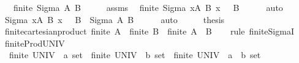 \begin{isabellebody}
\ \ \ {\isachardoublequoteopen}finite\ {\isacharparenleft}{\kern0pt}Sigma\ A\ B{\isacharparenright}{\kern0pt}{\isachardoublequoteclose}\isanewline
%
\isadelimproof
%
\endisadelimproof
%
\isatagproof
{}\isamarkupfalse%
\ {\isacharminus}{\kern0pt}\isanewline
\ \ \isamarkupfalse%
\ assms\ \isamarkupfalse%
\ {\isachardoublequoteopen}finite\ {\isacharparenleft}{\kern0pt}Sigma\ {\isacharbraceleft}{\kern0pt}x{\isasymin}A{\isachardot}{\kern0pt}\ B\ x\ {\isasymnoteq}\ {\isacharbraceleft}{\kern0pt}{\isacharbraceright}{\kern0pt}{\isacharbraceright}{\kern0pt}\ B{\isacharparenright}{\kern0pt}{\isachardoublequoteclose}\isanewline
\ \ \ \ \isamarkupfalse%
\ auto\isanewline
\ \ \isamarkupfalse%
\ \isamarkupfalse%
\ {\isachardoublequoteopen}Sigma\ {\isacharbraceleft}{\kern0pt}x{\isacharcolon}{\kern0pt}A{\isachardot}{\kern0pt}\ B\ x\ {\isasymnoteq}\ {\isacharbraceleft}{\kern0pt}{\isacharbraceright}{\kern0pt}{\isacharbraceright}{\kern0pt}\ B\ {\isacharequal}{\kern0pt}\ Sigma\ A\ B{\isachardoublequoteclose}\isanewline
\ \ \ \ \isamarkupfalse%
\ auto\isanewline
\ \ \isamarkupfalse%
\ \isamarkupfalse%
\ {\isacharquery}{\kern0pt}thesis\ \isacommand{{\isachardot}{\kern0pt}}\isamarkupfalse%
\isanewline
{}\isamarkupfalse%
%
\endisatagproof
{\isafoldproof}%
%
\isadelimproof
\isanewline
%
\endisadelimproof
\isanewline
{}\isamarkupfalse%
\ finite{\isacharunderscore}{\kern0pt}cartesian{\isacharunderscore}{\kern0pt}product{\isacharcolon}{\kern0pt}\ {\isachardoublequoteopen}finite\ A\ {\isasymLongrightarrow}\ finite\ B\ {\isasymLongrightarrow}\ finite\ {\isacharparenleft}{\kern0pt}A\ {\isasymtimes}\ B{\isacharparenright}{\kern0pt}{\isachardoublequoteclose}\isanewline
%
\isadelimproof
\ \ %
\endisadelimproof
%
\isatagproof
{}\isamarkupfalse%
\ {\isacharparenleft}{\kern0pt}rule\ finite{\isacharunderscore}{\kern0pt}SigmaI{\isacharparenright}{\kern0pt}%
\endisatagproof
{\isafoldproof}%
%
\isadelimproof
\isanewline
%
\endisadelimproof
\isanewline
{}\isamarkupfalse%
\ finite{\isacharunderscore}{\kern0pt}Prod{\isacharunderscore}{\kern0pt}UNIV{\isacharcolon}{\kern0pt}\isanewline
\ \ {\isachardoublequoteopen}finite\ {\isacharparenleft}{\kern0pt}UNIV\ {\isacharcolon}{\kern0pt}{\isacharcolon}{\kern0pt}\ {\isacharprime}{\kern0pt}a\ set{\isacharparenright}{\kern0pt}\ {\isasymLongrightarrow}\ finite\ {\isacharparenleft}{\kern0pt}UNIV\ {\isacharcolon}{\kern0pt}{\isacharcolon}{\kern0pt}\ {\isacharprime}{\kern0pt}b\ set{\isacharparenright}{\kern0pt}\ {\isasymLongrightarrow}\ finite\ {\isacharparenleft}{\kern0pt}UNIV\ {\isacharcolon}{\kern0pt}{\isacharcolon}{\kern0pt}\ {\isacharparenleft}{\kern0pt}{\isacharprime}{\kern0pt}a\ {\isasymtimes}\ {\isacharprime}{\kern0pt}b{\isacharparenright}{\kern0pt}\ set{\isacharparenright}{\kern0pt}{\isachardoublequoteclose}\isanewline

\end{isabellebody}
